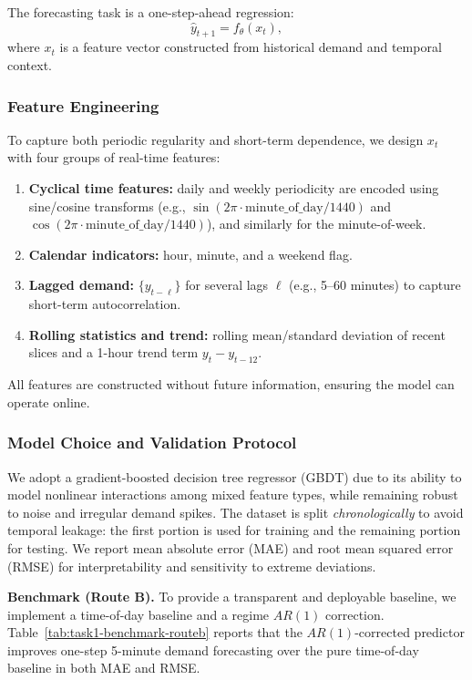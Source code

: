 The forecasting task is a one-step-ahead regression:
\begin{equation}
\hat{y}_{t+1} = f_{\theta}(x_t),
\end{equation}
where $x_t$ is a feature vector constructed from historical demand and temporal context.

\subsubsection{Feature Engineering}
To capture both periodic regularity and short-term dependence, we design $x_t$ with four groups of real-time features:
\begin{enumerate}[label = (\alph*)]
    \item \textbf{Cyclical time features:} daily and weekly periodicity are encoded using sine/cosine transforms (e.g.,
    $\sin(2\pi \cdot \text{minute\_of\_day}/1440)$ and $\cos(2\pi \cdot \text{minute\_of\_day}/1440)$), and similarly for the minute-of-week.
    \item \textbf{Calendar indicators:} hour, minute, and a weekend flag.
    \item \textbf{Lagged demand:} $\{y_{t-\ell}\}$ for several lags $\ell$ (e.g., 5--60 minutes) to capture short-term autocorrelation.
    \item \textbf{Rolling statistics and trend:} rolling mean/standard deviation of recent slices and a 1-hour trend term $y_{t}-y_{t-12}$.
\end{enumerate}
All features are constructed without future information, ensuring the model can operate online.

\subsubsection{Model Choice and Validation Protocol}
We adopt a gradient-boosted decision tree regressor (GBDT) due to its ability to model nonlinear interactions among mixed feature types, while remaining robust to noise and irregular demand spikes\cite{gbdt_chen,friedman2001gbm}. The dataset is split \emph{chronologically} to avoid temporal leakage: the first portion is used for training and the remaining portion for testing. We report mean absolute error (MAE) and root mean squared error (RMSE) for interpretability and sensitivity to extreme deviations.

\noindent\textbf{Benchmark (Route B).}
To provide a transparent and deployable baseline, we implement a time-of-day baseline and a regime $AR(1)$ correction.
Table~\ref{tab:task1-benchmark-routeb} reports that the $AR(1)$-corrected predictor improves one-step 5-minute demand forecasting
over the pure time-of-day baseline in both MAE and RMSE.

